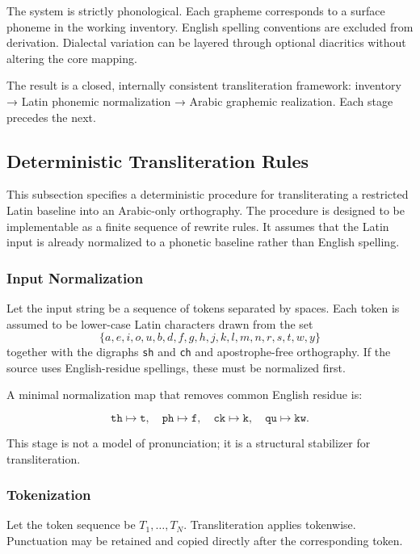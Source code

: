\documentclass[12pt]{article}
\begin{document}
The system is strictly phonological. Each grapheme corresponds to a surface phoneme in the working inventory. English spelling conventions are excluded from derivation. Dialectal variation can be layered through optional diacritics without altering the core mapping.

The result is a closed, internally consistent transliteration framework: inventory → Latin phonemic normalization → Arabic graphemic realization. Each stage precedes the next.

\subsection{Deterministic Transliteration Rules}

This subsection specifies a deterministic procedure for transliterating a restricted Latin baseline into an Arabic-only orthography. The procedure is designed to be implementable as a finite sequence of rewrite rules. It assumes that the Latin input is already normalized to a phonetic baseline rather than English spelling.

\subsubsection{Input Normalization}

Let the input string be a sequence of tokens separated by spaces. Each token is assumed to be lower-case Latin characters drawn from the set
\[
\{a,e,i,o,u,b,d,f,g,h,j,k,l,m,n,r,s,t,w,y\}
\]
together with the digraphs \texttt{sh} and \texttt{ch} and apostrophe-free orthography. If the source uses English-residue spellings, these must be normalized first.

A minimal normalization map that removes common English residue is:

\[
\texttt{th} \mapsto \texttt{t},\quad
\texttt{ph} \mapsto \texttt{f},\quad
\texttt{ck} \mapsto \texttt{k},\quad
\texttt{qu} \mapsto \texttt{kw}.
\]

This stage is not a model of pronunciation; it is a structural stabilizer for transliteration.

\subsubsection{Tokenization}

Let the token sequence be $T_1,\dots,T_N$. Transliteration applies tokenwise. Punctuation may be retained and copied directly after the corresponding token.
\end{document}
